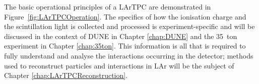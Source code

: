 The basic operational principles of a LArTPC are demonstrated in Figure~\ref{fig:LArTPCOperation}.  The specifics of how the ionisation charge and the scintillation light is collected and processed is experiment-specific and will be discussed in the context of DUNE in Chapter \ref{chap:DUNE} and the 35~ton experiment in Chapter \ref{chap:35ton}.  This information is all that is required to fully understand and analyse the interactions occurring in the detector; methods used to reconstruct particles and interactions in LAr will be the subject of Chapter \ref{chap:LArTPCReconstruction}.

